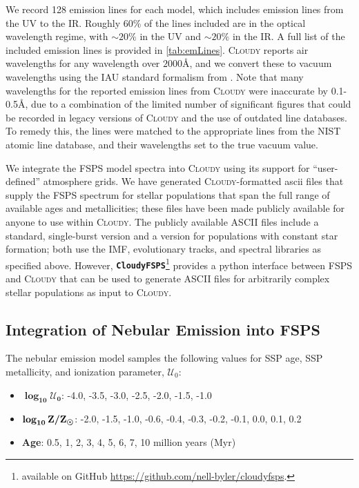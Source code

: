 \documentclass[trackchanges, twocolumn, tighten]{aastex61}
\newcommand{\Tab}[1]{\autoref{tab:#1}}
\newcommand{\FSPS}{{\sc FSPS}\xspace}
\newcommand{\CloudyFSPS}{{\tt \textbf{CloudyFSPS}}\xspace}
\newcommand{\Cloudy}{\textsc{Cloudy}\xspace}
\newcommand{\ang}{\ensuremath{\mbox{\AA}}}
\newcommand{\U}{\ensuremath{\mathcal{U}_{0}}}
\begin{document}
We record 128 emission lines for each model, which includes emission lines from the UV to the IR. Roughly 60\% of the lines included are in the optical wavelength regime, with ${\sim20}\%$ in the UV and ${\sim}20\%$ in the IR. A full list of the included emission lines is provided in \Tab{emLines}. \Cloudy reports air wavelengths for any wavelength over $2000\ang$, and we convert these to vacuum wavelengths using the IAU standard formalism from \citet{Morton1991}. Note that many wavelengths for the reported emission lines from \Cloudy were inaccurate by 0.1-0.5\AA, due to a combination of the limited number of significant figures that could be recorded in legacy versions of \Cloudy and the use of outdated line databases. To remedy this, the lines were matched to the appropriate lines from the NIST atomic line database, and their wavelengths set to the true vacuum value.

We integrate the \FSPS model spectra into \Cloudy using its support for ``user-defined'' atmosphere grids. We have generated \Cloudy-formatted ascii files that supply the \FSPS spectrum for stellar populations that span the full range of available ages and metallicities; these files have been made publicly available for anyone to use within \Cloudy. The publicly available ASCII files include a standard, single-burst version and a version for populations with constant star formation; both use the IMF, evolutionary tracks, and spectral libraries as specified above. However, \CloudyFSPS\footnote{available on GitHub \url{https://github.com/nell-byler/cloudyfsps}.} provides a python interface between \FSPS and \Cloudy that can be used to generate ASCII files for arbitrarily complex stellar populations as input to \Cloudy.

\subsection{Integration of Nebular Emission into \FSPS}\label{sec:methods:fsps}

The nebular emission model samples the following values for SSP age, SSP metallicity, and ionization parameter, \U{}:
\begin{itemize}
\item[] $\boldsymbol{\log_{10} \mathcal{U}_0}$: -4.0, -3.5, -3.0, -2.5, -2.0, -1.5, -1.0
\item[] $\boldsymbol{\log_{10} {\rm Z}/{\rm Z}_{\odot}}$: -2.0, -1.5, -1.0, -0.6, -0.4, -0.3, -0.2, -0.1, 0.0, 0.1, 0.2
\item[] {\bf Age}: 0.5, 1, 2, 3, 4, 5, 6, 7, 10 million years (Myr)
\end{itemize}
\end{document}
